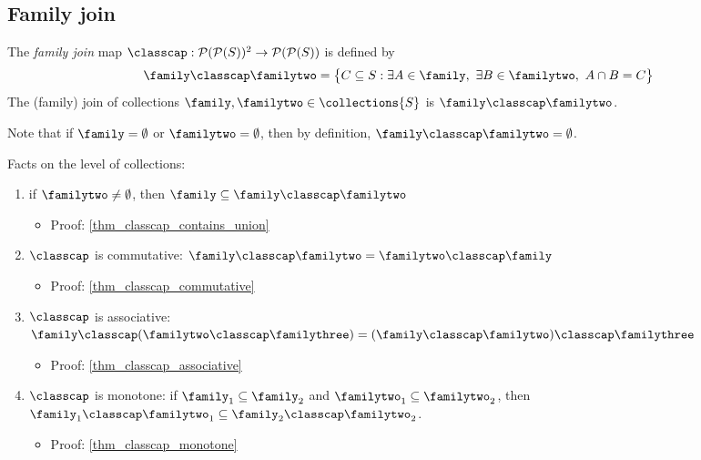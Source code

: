 \clearpage

\subsection{Family join}

\begin{definition}
     The \emph{family join} map $\classcap: \mathcal{P}(\mathcal{P}(S))^2 \to \mathcal{P}(\mathcal{P}(S))$ is defined by
    \[\family \classcap \familytwo = \big\{C \subseteq S : \exists A \in \family, \ \exists B \in \familytwo, \ A \cap B = C \big\}\]
    The (family) join of collections $\family, \familytwo \in \collections{S}$ is $\family \classcap \familytwo$.
\end{definition}

Note that if $\family = \emptyset$ or $\familytwo = \emptyset$, then by definition, $\family \classcap \familytwo = \emptyset$.

\vskip0.5cm

Facts on the level of collections:
\begin{enumerate}
    \item {} if $\familytwo \neq \emptyset$, then $\family \subseteq \family \classcap \familytwo$
    \begin{itemize}
        \item Proof: \cref{thm_classcap_contains_union}
    \end{itemize}

    \item $\classcap$ is commutative: $\family \classcap \familytwo = \familytwo \classcap \family$
    \begin{itemize}
        \item Proof: \cref{thm_classcap_commutative}
    \end{itemize}
    
    \item $\classcap$ is associative: $\family \classcap (\familytwo \classcap \familythree) = (\family \classcap \familytwo) \classcap \familythree$
    \begin{itemize}
        \item Proof: \cref{thm_classcap_associative}
    \end{itemize}
    
    \item $\classcap$ is monotone: if $\family_1 \subseteq \family_2$ and $\familytwo_1 \subseteq \familytwo_2$, then $\family_1 \classcap \familytwo_1 \subseteq \family_2 \classcap \familytwo_2$.
    \begin{itemize}
        \item Proof: \cref{thm_classcap_monotone}
    \end{itemize}
\end{enumerate}

